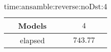 \begin{table}[!ht]
	\centering
	\begin{tabular}{|c|c|}
		\hline
		Models & $4$ \\ \hline
		elapsed & $743.77$ \\ \hline
	\end{tabular}
	\caption{time:ansamble:reverse:noDst:4}
	\label{tab:time:ansamble:reverse:noDst:4}
\end{table}
